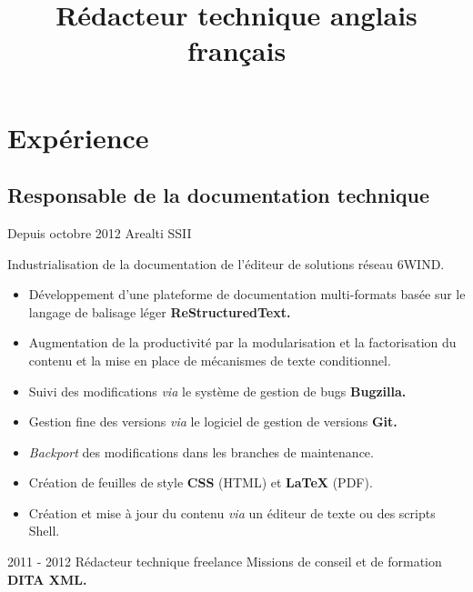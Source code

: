 \documentclass[12pt,a4paper,roman]{moderncv}
\title
    {Rédacteur technique anglais français}
\begin{document}
\makecvtitle %


\section{Expérience}

\subsection{Responsable de la documentation technique}

\cventry
    {Depuis octobre 2012}
    {Arealti}
    {SSII}
    {}
    {}
    {Industrialisation de la documentation de l'éditeur de solutions réseau
      6WIND.
      \begin{itemize}
      \item Développement d'une plateforme de documentation multi-formats
        basée sur le langage de balisage léger \textbf{ReStructuredText.}
      \item Augmentation de la productivité par la modularisation et la
        factorisation du contenu et la mise en place de mécanismes de texte
        conditionnel.
      \item Suivi des modifications \emph{via} le système de gestion de
        bugs \textbf{Bugzilla.}
      \item Gestion fine des versions \emph{via} le logiciel de gestion de
        versions \textbf{Git.}
      \item \emph{Backport} des modifications dans les branches de
        maintenance.
      \item Création de feuilles de style \textbf{CSS} (HTML) et
        \textbf{\LaTeX} (PDF).
      \item Création et mise à jour du contenu \emph{via} un éditeur de texte
        ou des scripts Shell.
      \end{itemize}
    }


\cventry
    {2011 - 2012}
    {Rédacteur technique freelance}
    {\textsc{}}
    {}
    {}
    {Missions de conseil et de formation \textbf{DITA XML.}}

\end{document}
